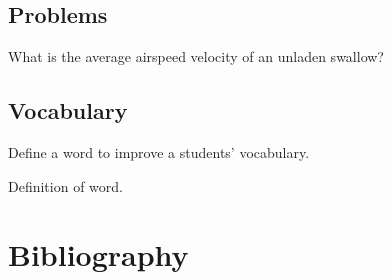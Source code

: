 \documentclass[11pt]{book} %
\begin{document}

\section{Problems}

\begin{problem}
What is the average airspeed velocity of an unladen swallow?
\end{problem}


\section{Vocabulary}

Define a word to improve a students' vocabulary.

\begin{vocabulary}[Word]
Definition of word.
\end{vocabulary}



\chapter*{Bibliography}


\printbibliography[heading=bibempty]






\cleardoublepage
{}
\setlength{\columnsep}{0.75cm}
\printindex

\end{document}
